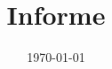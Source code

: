 \documentclass{article}
\begin{document}
    \title{Informe}
    \date{\today}

    \maketitle 
\end{document}
